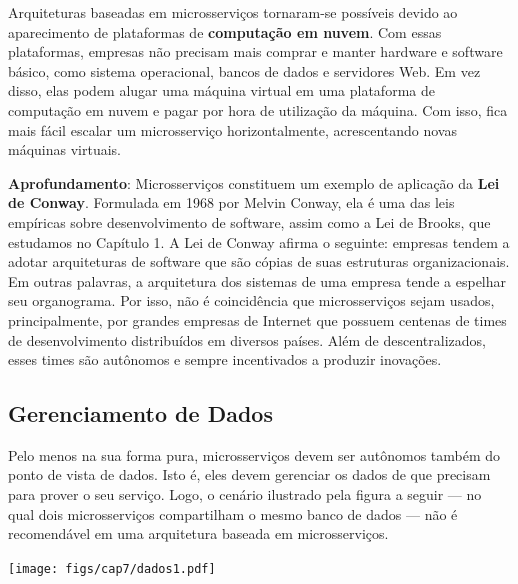 \documentclass[
  11pt,
  twoside]{book}
\newenvironment{esmbox}{\centering \vspace{1.5ex} \begin{tcolorbox}[breakable, colback=backcolor, width=4.9in]}{\end{tcolorbox} \vspace{1.5ex}}
\begin{document}
Arquiteturas baseadas em microsserviços tornaram-se possíveis devido ao
aparecimento de plataformas de \textbf{computação em nuvem}.
 Com essas plataformas, empresas não precisam
mais comprar e manter hardware e software básico, como sistema
operacional, bancos de dados e servidores Web. Em vez disso, elas podem
alugar uma máquina virtual em uma plataforma de computação em nuvem e
pagar por hora de utilização da máquina. Com isso, fica mais fácil
escalar um microsserviço horizontalmente, acrescentando novas máquinas
virtuais.

 

\begin{esmbox}

\textbf{Aprofundamento}: Microsserviços constituem um exemplo de
aplicação da \textbf{Lei de Conway}. Formulada em 1968 por Melvin
Conway, ela é uma das leis empíricas sobre desenvolvimento de software,
assim como a Lei de Brooks, que estudamos no Capítulo 1. A Lei de Conway
afirma o seguinte: empresas tendem a adotar arquiteturas de software que
são cópias de suas estruturas organizacionais. Em outras palavras, a
arquitetura dos sistemas de uma empresa tende a espelhar seu
organograma. Por isso, não é coincidência que microsserviços sejam
usados, principalmente, por grandes empresas de Internet que possuem
centenas de times de desenvolvimento distribuídos em diversos países.
Além de descentralizados, esses times são autônomos e sempre
incentivados a produzir inovações.

\end{esmbox}

\hypertarget{gerenciamento-de-dados}{%
\subsection{Gerenciamento de Dados}\label{gerenciamento-de-dados}}


Pelo menos na sua forma pura, microsserviços devem ser autônomos também
do ponto de vista de dados. Isto é, eles devem gerenciar os dados de que
precisam para prover o seu serviço. Logo, o cenário ilustrado pela
figura a seguir --- no qual dois microsserviços compartilham o mesmo
banco de dados --- não é recomendável em uma arquitetura baseada em
microsserviços.

\begin{center}

\texttt{[image: figs/cap7/dados1.pdf]}

\end{center}
\end{document}

